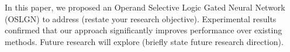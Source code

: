 In this paper, we proposed an Operand Selective Logic Gated Neural Network (OSLGN) to address (restate your research objective). Experimental results confirmed that our approach significantly improves performance over existing methods. Future research will explore (briefly state future research direction).
